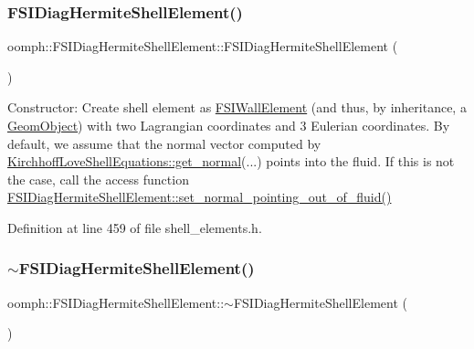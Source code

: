 \subsubsection{\texorpdfstring{F\+S\+I\+Diag\+Hermite\+Shell\+Element()}{FSIDiagHermiteShellElement()}}
{\footnotesize\ttfamily oomph\+::\+F\+S\+I\+Diag\+Hermite\+Shell\+Element\+::\+F\+S\+I\+Diag\+Hermite\+Shell\+Element (\begin{DoxyParamCaption}{ }\end{DoxyParamCaption})\hspace{0.3cm}{\ttfamily [inline]}}



Constructor\+: Create shell element as \hyperlink{classoomph_1_1FSIWallElement}{F\+S\+I\+Wall\+Element} (and thus, by inheritance, a \hyperlink{classoomph_1_1GeomObject}{Geom\+Object}) with two Lagrangian coordinates and 3 Eulerian coordinates. By default, we assume that the normal vector computed by \hyperlink{classoomph_1_1KirchhoffLoveShellEquations_a797e455634ac8b8e8669c4adff84e644}{Kirchhoff\+Love\+Shell\+Equations\+::get\+\_\+normal}(...) points into the fluid. If this is not the case, call the access function \hyperlink{classoomph_1_1FSIDiagHermiteShellElement_a4c2485cc6e268e9201f914166852ca90}{F\+S\+I\+Diag\+Hermite\+Shell\+Element\+::set\+\_\+normal\+\_\+pointing\+\_\+out\+\_\+of\+\_\+fluid()} 



Definition at line 459 of file shell\+\_\+elements.\+h.

\mbox{\label{classoomph_1_1FSIDiagHermiteShellElement_a7ae23be78dc5ef53c3b88d3f78229e40}} 
\subsubsection{\texorpdfstring{$\sim$\+F\+S\+I\+Diag\+Hermite\+Shell\+Element()}{~FSIDiagHermiteShellElement()}}
{\footnotesize\ttfamily oomph\+::\+F\+S\+I\+Diag\+Hermite\+Shell\+Element\+::$\sim$\+F\+S\+I\+Diag\+Hermite\+Shell\+Element (\begin{DoxyParamCaption}{ }\end{DoxyParamCaption})\hspace{0.3cm}{\ttfamily [inline]}}



